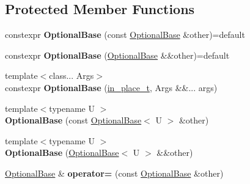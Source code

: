 \subsection*{Protected Member Functions}
\begin{DoxyCompactItemize}
\item 
\mbox{\label{classv8_1_1base_1_1internal_1_1OptionalBase_a6fef40b21865c3ae88b6fb504b41174c}} 
constexpr {\bfseries Optional\+Base} (const \mbox{\hyperlink{classv8_1_1base_1_1internal_1_1OptionalBase}{Optional\+Base}} \&other)=default
\item 
\mbox{\label{classv8_1_1base_1_1internal_1_1OptionalBase_a8cda811ba2c0cf4f0fbf0077e3c3bf59}} 
constexpr {\bfseries Optional\+Base} (\mbox{\hyperlink{classv8_1_1base_1_1internal_1_1OptionalBase}{Optional\+Base}} \&\&other)=default
\item 
\mbox{\label{classv8_1_1base_1_1internal_1_1OptionalBase_aab0587aa24bc5fb50ac2d37188e65d2f}} 
{\footnotesize template$<$class... Args$>$ }\\constexpr {\bfseries Optional\+Base} (\mbox{\hyperlink{structv8_1_1base_1_1in__place__t}{in\+\_\+place\+\_\+t}}, Args \&\&... args)
\item 
\mbox{\label{classv8_1_1base_1_1internal_1_1OptionalBase_a33daa6b5a11d99c6a34979482cf5e911}} 
{\footnotesize template$<$typename U $>$ }\\{\bfseries Optional\+Base} (const \mbox{\hyperlink{classv8_1_1base_1_1internal_1_1OptionalBase}{Optional\+Base}}$<$ U $>$ \&other)
\item 
\mbox{\label{classv8_1_1base_1_1internal_1_1OptionalBase_ae9c309138f9b98584e5aae41c3d34117}} 
{\footnotesize template$<$typename U $>$ }\\{\bfseries Optional\+Base} (\mbox{\hyperlink{classv8_1_1base_1_1internal_1_1OptionalBase}{Optional\+Base}}$<$ U $>$ \&\&other)
\item 
\mbox{\label{classv8_1_1base_1_1internal_1_1OptionalBase_acbd2a28d59f8873e3e85e12e9a3a68f1}} 
\mbox{\hyperlink{classv8_1_1base_1_1internal_1_1OptionalBase}{Optional\+Base}} \& {\bfseries operator=} (const \mbox{\hyperlink{classv8_1_1base_1_1internal_1_1OptionalBase}{Optional\+Base}} \&other)

\end{DoxyCompactItemize}
